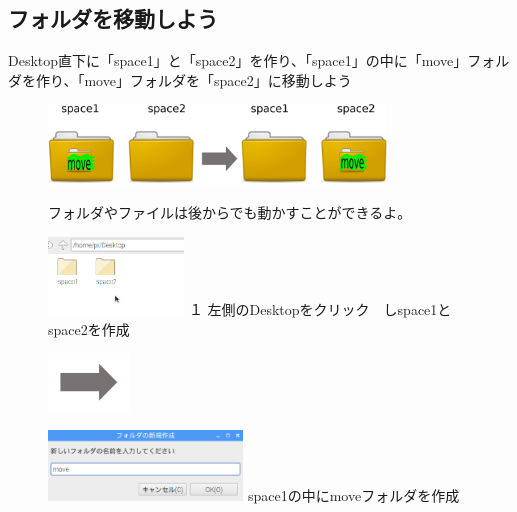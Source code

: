 \documentclass[a4paper,12pt]{jarticle}
\begin{document}
\subsection{\theExercise フォルダを移動しよう}
Desktop直下に「space1」と「space2」を作り、「space1」の中に「move」フォルダを作り、「move」フォルダを「space2」に移動しよう



\begin{figure}[ht]
  \centering
  \includegraphics[width=0.8\textwidth]{fig15-1.eps}
  \begin{minipage}{15.297cm}
    フォルダやファイルは後からでも動かすことができるよ。
  \end{minipage}

  \begin{minipage}{5.963cm}
    \includegraphics[width=3.604cm]{textbook-img051.png}
    {\flushleft
      １
      左側のDesktopをクリック　しspace1とspace2を作成
    }
  \end{minipage}
  \includegraphics[width=2.168cm]{textbook-img052.png}
  \begin{minipage}{7.473cm}
    \includegraphics[width=5.166cm]{textbook-img050.png}
    { space1の中にmoveフォルダを作成
    }
  \end{minipage}


\end{figure}
\end{document}
